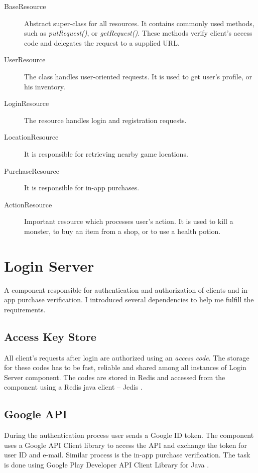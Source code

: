 \begin{description}	
	\item[BaseResource] Abstract super-class for all resources. It contains commonly used methods, such as \textit{putRequest()}, or \textit{getRequest()}. These methods verify client's access code and delegates the request to a supplied URL.
	
	\item[UserResource] The class handles user-oriented requests. It is used to get user's profile, or his inventory.
	
	\item[LoginResource] The resource handles login and registration requests.
	
	\item[LocationResource] It is responsible for retrieving nearby game locations.
	
	\item[PurchaseResource] It is responsible for in-app purchases.

	\item[ActionResource] Important resource which processes user's action. It is used to kill a monster, to buy an item from a shop, or to use a health potion.
\end{description}

\section{Login Server}
A component responsible for authentication and authorization of clients and in-app purchase verification. I introduced several dependencies to help me fulfill the requirements.
 
\subsection{Access Key Store}
All client's requests after login are authorized using an \textit{access code}. The storage for these codes has to be fast, reliable and shared among all instances of Login Server component. The codes are stored in Redis and accessed from the component using a Redis java client -- Jedis \cite{jedis}. 

\subsection{Google API}
During the authentication process user sends a Google ID token. The component uses a Google API Client library \cite{googleapilibs} to access the API and exchange the token for user ID and e-mail. Similar process is the in-app purchase verification. The task is done using Google Play Developer API Client Library for Java  \cite{androidpublisherlibary}.

